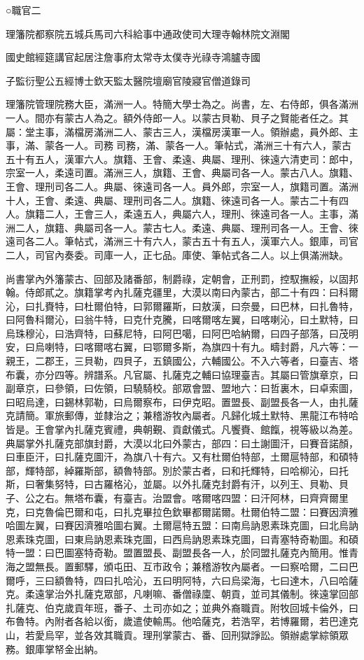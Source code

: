 
\begin{pinyinscope}
○職官二

理籓院都察院五城兵馬司六科給事中通政使司大理寺翰林院文淵閣

國史館經筵講官起居注詹事府太常寺太僕寺光祿寺鴻臚寺國

子監衍聖公五經博士欽天監太醫院壇廟官陵寢官僧道錄司

理籓院管理院務大臣，滿洲一人。特簡大學士為之。尚書，左、右侍郎，俱各滿洲一人。間亦有蒙古人為之。額外侍郎一人。以蒙古貝勒、貝子之賢能者任之。其屬：堂主事，滿檔房滿洲二人、蒙古三人，漢檔房漢軍一人。領辦處，員外郎、主事，滿、蒙各一人。司務司務，滿、蒙各一人。筆帖式，滿洲三十有六人，蒙古五十有五人，漢軍六人。旗籍、王會、柔遠、典屬、理刑、徠遠六清吏司：郎中，宗室一人，柔遠司置。滿洲三人，旗籍、王會、典屬司各一人。蒙古八人。旗籍、王會、理刑司各二人。典屬、徠遠司各一人。員外郎，宗室一人，旗籍司置。滿洲十人，王會、柔遠、典屬、理刑司各二人。旗籍、徠遠司各一人。蒙古二十有四人。旗籍二人，王會三人，柔遠五人，典屬六人，理刑、徠遠司各一人。主事，滿洲二人，旗籍、典屬司各一人。蒙古七人。柔遠、典屬、理刑司各一人。王會、徠遠司各二人。筆帖式，滿洲三十有六人，蒙古五十有五人，漢軍六人。銀庫，司官二人，司官內奏委。司庫一人，正七品。庫使、筆帖式各二人。以上俱滿洲缺。

尚書掌內外籓蒙古、回部及諸番部，制爵祿，定朝會，正刑罰，控馭撫綏，以固邦翰。侍郎貳之。旗籍掌考內扎薩克疆里，大漠以南曰內蒙古，部二十有四：曰科爾沁，曰扎賚特，曰杜爾伯特，曰郭爾羅斯，曰敖漢，曰奈曼，曰巴林，曰扎魯特，曰阿魯科爾沁，曰翁牛特，曰克什克騰，曰喀爾喀左翼，曰喀喇沁，曰土默特，曰烏珠穆沁，曰浩齊特，曰蘇尼特，曰阿巴噶，曰阿巴哈納爾，曰四子部落，曰茂明安，曰烏喇特，曰喀爾喀右翼，曰鄂爾多斯，為旗四十有九。疇封爵，凡六等：一親王，二郡王，三貝勒，四貝子，五鎮國公，六輔國公。不入六等者，曰臺吉、塔布囊，亦分四等。辨譜系。凡官屬、扎薩克之輔曰協理臺吉。其屬曰管旗章京，曰副章京，曰參領，曰佐領，曰驍騎校。部眾會盟、盟地六：曰哲裏木，曰卓索圖，曰昭烏達，曰錫林郭勒，曰烏爾察布，曰伊克昭。置盟長、副盟長各一人，由扎薩克請簡。軍旅郵傳，並隸治之；兼稽游牧內屬者。凡歸化城土默特、黑龍江布特哈皆是。王會掌內扎薩克賓禮，典朝覲、貢獻儀式。凡饗賚、館餼，視等級以為差。典屬掌外扎薩克部旗封爵，大漠以北曰外蒙古，部四：曰土謝圖汗，曰賽音諾顏，曰車臣汗，曰扎薩克圖汗，為旗八十有六。又有杜爾伯特部，土爾扈特部，和碩特部，輝特部，綽羅斯部，額魯特部。別於蒙古者，曰和托輝特，曰哈柳沁，曰托斯，曰奢集努特，曰古羅格沁，並屬。以外扎薩克封爵有汗，以列王、貝勒、貝子、公之右。無塔布囊，有臺吉。治盟會。喀爾喀四盟：曰汗阿林，曰齊齊爾里克，曰克魯倫巴爾和屯，曰扎克畢拉色欽畢都爾諾爾。杜爾伯特二盟：曰賽因濟雅哈圖左翼，曰賽因濟雅哈圖右翼。土爾扈特五盟：曰南烏訥恩素珠克圖，曰北烏訥恩素珠克圖，曰東烏訥恩素珠克圖，曰西烏訥恩素珠克圖，曰青塞特奇勒圖。和碩特一盟：曰巴圖塞特奇勒。盟置盟長、副盟長各一人，於同盟扎薩克內簡用。惟青海之盟無長。置郵驛，頒屯田、互市政令；兼稽游牧內屬者。一曰察哈爾，二曰巴爾呼，三曰額魯特，四曰扎哈沁，五曰明阿特，六曰烏梁海，七曰達木，八曰哈薩克。柔遠掌治外扎薩克眾部，凡喇嘛、番僧祿廩、朝貢，並司其儀制。徠遠掌回部扎薩克、伯克歲貢年班，番子、土司亦如之；並典外裔職貢。附牧回城卡倫外，曰布魯特。內附者各給以銜，歲遣使輸馬。他哈薩克，若浩罕，若博羅爾，若巴達克山，若愛烏罕，並各效其職貢。理刑掌蒙古、番、回刑獄諍訟。領辦處掌綜領眾務。銀庫掌帑金出納。


\end{pinyinscope}
